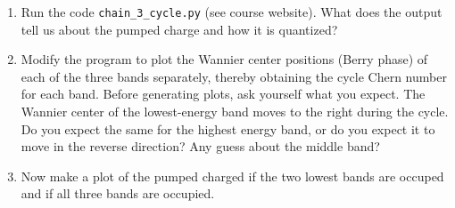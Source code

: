\documentclass{jhwhw}
\begin{document}
\begin{enumerate}
  \item Run the code \texttt{chain_3_cycle.py} (see course website). What does the output tell us about the pumped charge and how it is quantized?
  \item Modify the program to plot the Wannier center positions (Berry phase) of each of the three bands separately, thereby obtaining the cycle Chern number for each band. Before generating plots, ask yourself what you expect. The Wannier center of the lowest-energy band moves to the right during the cycle. Do you expect the same for the highest energy band, or do you expect it to move in the reverse direction? Any guess about the middle band?
  \item Now make a plot of the pumped charged if the two lowest bands are occuped and if all three bands are occupied.
\end{enumerate}
\end{document}
